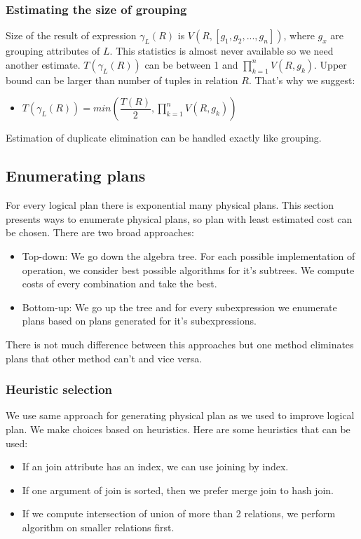 \subsubsection{Estimating the size of grouping}
Size of the result of expression $\gamma_L(R)$ is $V(R,[g_1,g_2,...,g_n])$, where $g_x$ are grouping attributes of $L$. This statistics is almost never available so we need another estimate. $T(\gamma_L(R))$ can be between 1 and $\prod_{k=1}^{n}{V(R,g_k)}$. Upper bound can be larger than number of tuples in relation $R$. That's why we suggest:
\begin{itemize}
\item $T(\gamma_L(R))=min(\dfrac{T(R)}{2},\prod_{k=1}^{n}{V(R,g_k)})$
\end{itemize}
Estimation of duplicate elimination can be handled exactly like grouping.

\subsection{Enumerating plans}
For every logical plan there is exponential many physical plans. This section presents ways to enumerate physical plans, so plan with least estimated cost can be chosen. There are two broad approaches:
\begin{itemize}
\item Top-down: We go down the algebra tree. For each possible implementation of operation, we consider best possible algorithms for it's subtrees. We compute costs of every combination and take the best.
\item Bottom-up: We go up the tree and for every subexpression we enumerate plans based on plans generated for it's subexpressions.
\end{itemize}

There is not much difference between this approaches but one method eliminates plans that other method can't and vice versa.
\subsubsection{Heuristic selection}

We use same approach for generating physical plan as we used to improve logical plan. We make choices based on heuristics. Here are some heuristics that can be used:

\begin{itemize}

\item If an join attribute has an index, we can use joining by index.
\item If one argument of join is sorted, then we prefer merge join to hash join.
\item If we compute intersection of union of more than 2 relations, we perform algorithm on smaller relations first.
\end{itemize}

